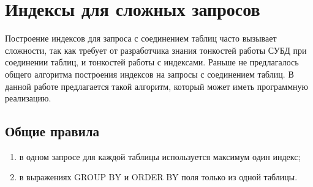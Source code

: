 \section{Индексы для сложных запросов}

Построение индексов для запроса с соединением таблиц часто вызывает сложности, так как требует от разработчика знания тонкостей работы СУБД при соединении таблиц, и тонкостей работы с индексами. Раньше не предлагалось общего алгоритма построения индексов на запросы с соединением таблиц. В данной работе предлагается такой алгоритм, который может иметь программную реализацию.

\subsection{Общие правила}
\begin{enumerate}
\item в одном запросе для каждой таблицы используется максимум один индекс;
\item в выражениях GROUP BY и ORDER BY поля только из одной таблицы.
\end{enumerate}
